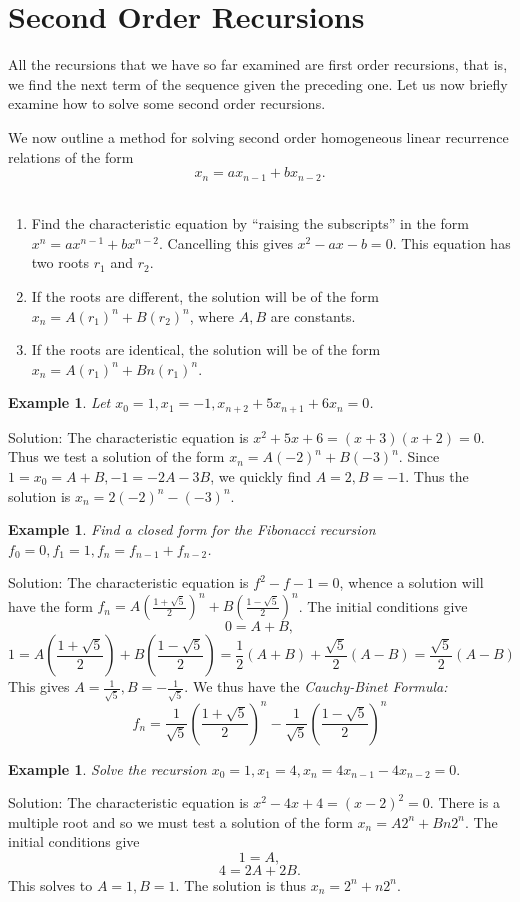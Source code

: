 \documentclass[11pt, openany]{book}
\theoremstyle{change} \theoremheaderfont{\blue\sffamily\bfseries}
\newtheorem{exa}[thm]{Example}
\theoremstyle{nonumberplain} \theoremheaderfont{\sffamily\bfseries}
\newcommand{\dis}{\displaystyle}
\newcommand{\í}{\'{\i}}
\begin{document}
\section{Second Order Recursions} All the
recursions that we have so far examined are first order
recursions, that is, we find the next term of the sequence given
the preceding one. Let us now briefly examine how to solve some
second order recursions.



We now outline a method for solving second order homogeneous
linear recurrence relations of the form
$$x_n = ax_{n - 1} + bx_{n - 2}.$$ \\
\begin{enumerate}
\item Find the characteristic equation  by ``raising the
subscripts'' in the form $x^n = ax^{n - 1}  + bx^{n - 2}$.
Cancelling this gives $x^2 - ax - b = 0.$ This equation has two
roots $r_1$ and $r_2.$ \item If the roots are different, the
solution will be of the form $x_n = A(r_1)^n + B(r_2)^n$, where
$A, B$ are  constants. \item If the roots are identical, the
solution will be of the form $x_n = A(r_1)^n + Bn(r_1)^n$.


\end{enumerate}
\begin{exa}
Let $x_0 = 1, x_1 = -1, x_{n + 2} + 5x_{n + 1} + 6x_n = 0$.

\end{exa}
Solution: The characteristic equation is $x^2 + 5x + 6 = (x + 3)(x
+ 2) = 0$. Thus we test a solution of the form $x_n = A(-2)^n +
B(-3)^n.$ Since $1 = x_0 = A + B, -1 = -2A - 3B$, we quickly find
$A = 2, B = -1.$ Thus the solution is $x_{n} = 2(-2)^n -(-3)^n.$
\begin{exa}
Find a closed form for the Fibonacci recursion $f_0 = 0, f_1 = 1,
f_n = f_{n - 1} + f_{n - 2}$.
\end{exa}
Solution: The characteristic equation is $f^2 - f - 1 = 0$, whence
a solution will have the form $\dis{f_n = A\left(\frac{1 +
\sqrt{5}}{2}\right)^n + B\left(\frac{1 - \sqrt{5}}{2}\right)^n}$.
The initial conditions give
$$0 = A + B,$$
$$1 = A\left(\frac{1 + \sqrt{5}}{2}\right) + B\left(\frac{1 - \sqrt{5}}{2}\right)
= \frac{1}{2}\left(A + B\right) + \frac{\sqrt{5}}{2}\left(A -
B\right) = \frac{\sqrt{5}}{2}\left(A - B\right)$$ This gives
$\dis{A = \frac{1}{\sqrt{5}}, B = -\frac{1}{\sqrt{5}}}$. We thus
have the {\em Cauchy-Binet Formula:}
\begin{equation}
f_n = \frac{1}{\sqrt{5}}\left(\frac{1 + \sqrt{5}}{2}\right)^n -
\frac{1}{\sqrt{5}}\left(\frac{1 - \sqrt{5}}{2}\right)^n
\end{equation}
\begin{exa}

Solve the recursion $x_0 = 1, x_1 = 4, x_n = 4x_{n - 1}  - 4x_{n -
2} = 0.$
\end{exa}
Solution: The characteristic equation is $x^2 - 4x + 4 = (x - 2)^2
= 0$. There is a multiple root and so we must test a solution of
the form $x_n = A2^n + Bn2^n.$ The initial conditions give
$$1 = A,$$
$$4 = 2A + 2B.$$ This solves to $A = 1, B = 1.$ The solution is thus $x_n = 2^n + n2^n$.
\clearpage
\end{document}
